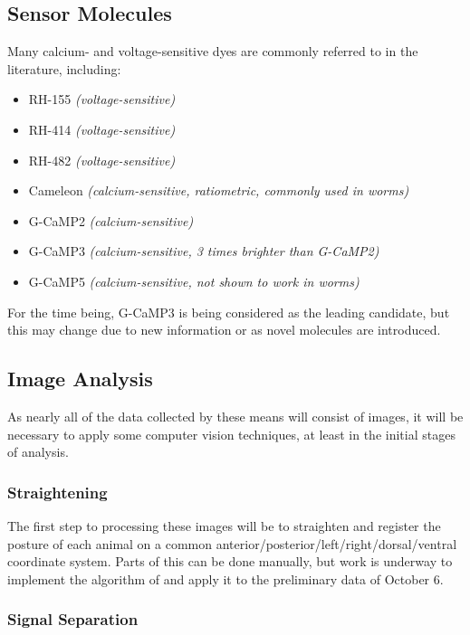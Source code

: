 \documentclass[letter,11pt]{article}
\begin{document}
\subsection{Sensor Molecules}

Many calcium- and voltage-sensitive dyes are commonly referred to in the literature,
including:
\begin{itemize}
\item RH-155 {\em (voltage-sensitive)}
\item RH-414 {\em (voltage-sensitive)}
\item RH-482 {\em (voltage-sensitive)}
\item Cameleon {\em (calcium-sensitive, ratiometric, commonly used in worms)}
\item G-CaMP2 {\em (calcium-sensitive)}
\item G-CaMP3 {\em (calcium-sensitive, 3 times brighter than G-CaMP2)}
\item G-CaMP5 {\em (calcium-sensitive, not shown to work in worms)}
\end{itemize}

For the time being, G-CaMP3 is being considered as the leading candidate, but this
may change due to new information or as novel molecules are introduced.

\subsection{Image Analysis}

As nearly all of the data collected by these means will consist of images, it will be
necessary to apply some computer vision techniques, at least in the initial stages of
analysis.

\subsubsection{Straightening}

The first step to processing these images will be to straighten and register the posture
of each animal on a common anterior/posterior/left/right/dorsal/ventral coordinate system.
Parts of this can be done manually, but work is underway to implement the algorithm of
\cite{straighten} and apply it to the preliminary data of October 6.

\subsubsection{Signal Separation}
\end{document}
